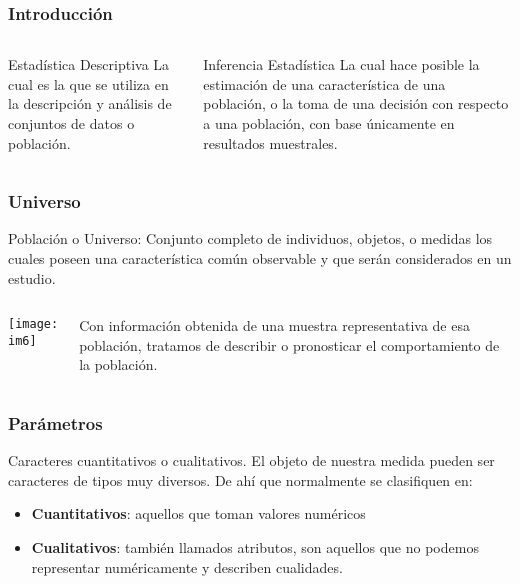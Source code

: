 \documentclass[spanish]{beamer}
\begin{document}
\begin{frame}
\frametitle{Introducción}
\begin{columns}
\begin{block}{Estadística Descriptiva}
La cual es la que se utiliza en la descripción y análisis de conjuntos de datos o población.
\end{block}

\begin{block}{Inferencia Estadística}
La cual hace posible la estimación de una característica de una población, o la toma de una decisión con respecto a una población, con base únicamente en resultados muestrales.
\end{block}

\end{columns}
\end{frame}
\begin{frame}
\frametitle{Universo}
Población o Universo: Conjunto completo de individuos, objetos, o medidas los cuales poseen
una característica común observable y que serán considerados en un estudio.
\begin{columns}
\begin{center}
\texttt{[image: im6]}
\end{center}

Con información obtenida de una muestra representativa de
esa población, tratamos de describir o pronosticar el comportamiento de la población.
\end{columns}
\end{frame}
\begin{frame}
\frametitle{Parámetros}
Caracteres cuantitativos o cualitativos. El objeto de nuestra medida pueden ser caracteres de tipos muy diversos. De ahí que normalmente se clasifiquen en:
\begin{itemize}
\item \textbf{Cuantitativos}: aquellos que toman valores numéricos
\item \textbf{Cualitativos}: también llamados atributos, son aquellos que no podemos representar numéricamente y describen cualidades.
\end{itemize}

\end{frame}
\end{document}
